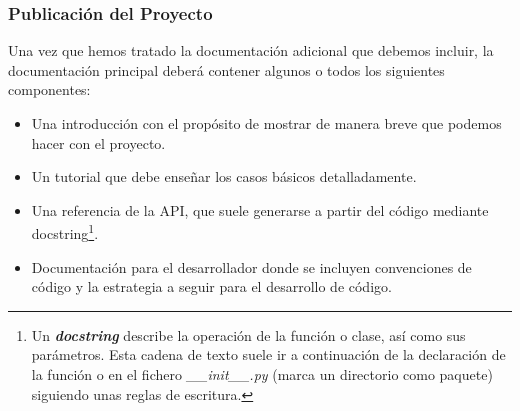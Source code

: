 \subsubsection*{Publicación del Proyecto}
Una vez que hemos tratado la documentación adicional que debemos incluir, la documentación principal deberá contener algunos o todos los siguientes componentes:
\begin{itemize}
    \item Una introducción con el propósito de mostrar de manera breve que podemos hacer con el proyecto.
    \item Un tutorial que debe enseñar los casos básicos detalladamente.
    \item Una referencia de la API, que suele generarse a partir del código mediante docstring\footnote{Un \emph{\textbf{docstring}} describe la operación de la función o clase, así como sus parámetros. Esta cadena de texto suele ir a continuación de la declaración de la función o en el fichero \textit{\_\_init\_\_.py} (marca un directorio como paquete) siguiendo unas reglas de escritura. }. 
    \item Documentación para el desarrollador donde se incluyen convenciones de código y la estrategia a seguir para el desarrollo de código. 
\end{itemize}

